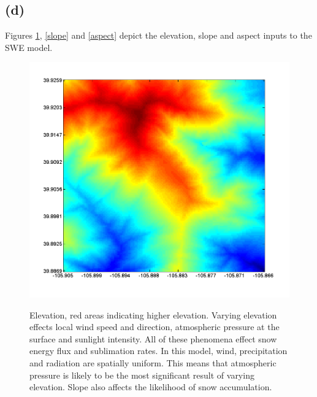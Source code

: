 \documentclass[fleqn, letterpaper]{tufte-handout}
\begin{document}
\subsection{(d)}
Figures \ref{elev}, \ref{slope} and \ref{aspect} depict the elevation, slope and aspect inputs to the SWE model.
\begin{figure}
	\includegraphics[width=\textwidth]{elev}
	\label{elev}
	\caption{Elevation, red areas indicating higher elevation. Varying elevation effects local wind speed and direction, atmospheric pressure at the surface and sunlight intensity. All of these phenomena effect snow energy flux and sublimation rates. In this model, wind, precipitation and radiation are spatially uniform. This means that atmospheric pressure is likely to be the most significant result of varying elevation. Slope also affects the likelihood of snow accumulation.}
\end{figure}
\end{document}
